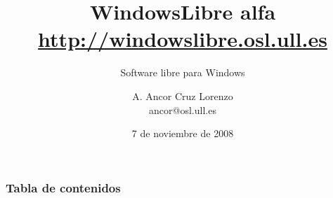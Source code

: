 \documentclass[10pt]{beamer}
\title[WindowsLibre - Software libre para Windows]{WindowsLibre \scriptsize{alfa} \\ \small{\url{http://windowslibre.osl.ull.es}}}
\subtitle{Software libre para Windows}
\author[Ancor Cruz, ancor@osl.ull.es]{A. Ancor Cruz Lorenzo \\ ancor@osl.ull.es}
\institute[OSL]{Oficina de Software Libre \\ Universidad de La Laguna \\ \url{http://osl.ull.es}}
\date{7 de noviembre de 2008}
\begin{document}
	\begin{frame}
		\titlepage
	\end{frame}

	\begin{frame}
		\frametitle{Tabla de contenidos}
		\tableofcontents
	\end{frame}

	
	
	
	
\end{document}
